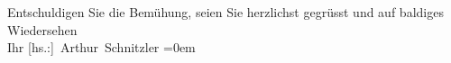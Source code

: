 \pstart
           Entschuldigen Sie die Bemühung, seien Sie herzlichst gegrüsst und auf baldiges
               Wiedersehen{\\[\baselineskip]}Ihr \spacefill\mbox{{[}hs.:{]} Arthur Schnitzler}\pend
           \leftskip=0em{}\endnumbering{}  
      